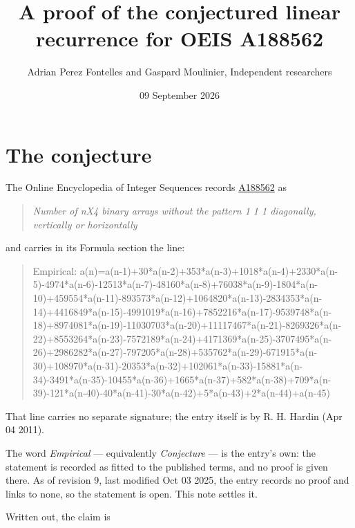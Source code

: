 \documentclass[11pt]{article}
\title{A proof of the conjectured linear recurrence for OEIS A188562}
\author{Adrian Perez Fontelles and Gaspard Moulinier, Independent researchers}
\date{09 September 2026}
\theoremstyle{definition}
\begin{document}
\maketitle
\section{The conjecture}

The Online Encyclopedia of Integer Sequences records \href{https://oeis.org/A188562}{A188562} as

\begin{quote}\itshape Number of nX4 binary arrays without the pattern 1 1 1 diagonally, vertically or horizontally\end{quote}

and carries in its Formula section the line:

\begin{quote}\ttfamily Empirical: a(n)=a(n-1)+30*a(n-2)+353*a(n-3)+1018*a(n-4)+2330*a(n-5)-4974*a(n-6)-12513*a(n-7)-48160*a(n-8)+76038*a(n-9)-1804*a(n-10)+459554*a(n-11)-893573*a(n-12)+1064820*a(n-13)-2834353*a(n-14)+4416849*a(n-15)-4991019*a(n-16)+7852216*a(n-17)-9539748*a(n-18)+8974081*a(n-19)-11030703*a(n-20)+11117467*a(n-21)-8269326*a(n-22)+8553264*a(n-23)-7572189*a(n-24)+4171369*a(n-25)-3707495*a(n-26)+2986282*a(n-27)-797205*a(n-28)+535762*a(n-29)-671915*a(n-30)+108970*a(n-31)-20353*a(n-32)+102061*a(n-33)-15881*a(n-34)-3491*a(n-35)-10455*a(n-36)+1665*a(n-37)+582*a(n-38)+709*a(n-39)-121*a(n-40)-40*a(n-41)-30*a(n-42)+5*a(n-43)+2*a(n-44)+a(n-45)\end{quote}

That line carries no separate signature; the entry itself is by R. H. Hardin (Apr 04 2011).

The word {\itshape Empirical} --- equivalently {\itshape Conjecture} --- is the entry's own: the statement is recorded as fitted to the published terms, and no proof is given there. As of revision 9, last modified Oct 03 2025, the entry records no proof and links to none, so the statement is open. This note settles it.

Written out, the claim is
\end{document}
